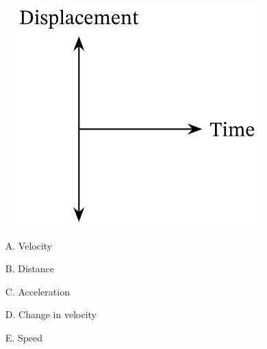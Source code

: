 \documentclass[A4,12pt]{article}
\begin{document}
\begin{enumerate}[label=\bfseries (\arabic*)]
\begin{figure}[H]
    \centering
    \includegraphics{Nagwa_q1_kingraph.png}
    \caption{}
    \label{fig:my_label}
\end{figure}

\begin{itemize}
    \item[A.] Velocity
    \item[B.] Distance
    \item[C.] Acceleration
    \item[D.] Change in velocity
    \item[E.] Speed
\end{itemize}











\end{enumerate}
\end{document}
